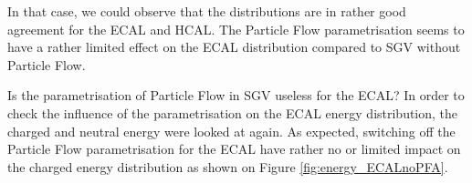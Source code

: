 
In that case, we could observe that the distributions are in rather good agreement for the ECAL and HCAL. The Particle Flow parametrisation seems to have a rather limited effect on the ECAL distribution compared to SGV without Particle Flow.

Is the parametrisation of Particle Flow in SGV useless for the ECAL? In order to check the influence of the parametrisation on the ECAL energy distribution, the charged and neutral energy were looked at again. As expected, switching off the Particle Flow parametrisation for the ECAL have rather no or limited impact on the charged energy distribution as shown on Figure \ref{fig:energy_ECALnoPFA}.

